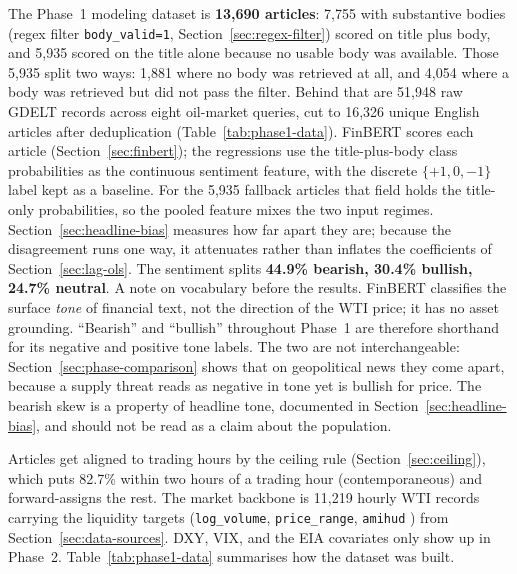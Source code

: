 The Phase~1 modeling dataset is \textbf{13{,}690 articles}: 7{,}755 with substantive bodies (regex filter \texttt{body\_valid=1}, Section~\ref{sec:regex-filter}) scored on title plus body, and 5{,}935 scored on the title alone because no usable body was available. Those 5{,}935 split two ways: 1{,}881 where no body was retrieved at all, and 4{,}054 where a body was retrieved but did not pass the filter. Behind that are 51{,}948 raw GDELT records across eight oil-market queries, cut to 16{,}326 unique English articles after deduplication (Table~\ref{tab:phase1-data}). FinBERT \citep{araci2019} scores each article (Section~\ref{sec:finbert}); the regressions use the title-plus-body class probabilities as the continuous sentiment feature, with the discrete $\{+1, 0, -1\}$ label kept as a baseline. For the 5{,}935 fallback articles that field holds the title-only probabilities, so the pooled feature mixes the two input regimes. Section~\ref{sec:headline-bias} measures how far apart they are; because the disagreement runs one way, it attenuates rather than inflates the coefficients of Section~\ref{sec:lag-ols}. The sentiment splits \textbf{44.9\% bearish, 30.4\% bullish, 24.7\% neutral}. A note on vocabulary before the results. FinBERT classifies the surface \emph{tone} of financial text, not the direction of the WTI price; it has no asset grounding. ``Bearish'' and ``bullish'' throughout Phase~1 are therefore shorthand for its negative and positive tone labels. The two are not interchangeable: Section~\ref{sec:phase-comparison} shows that on geopolitical news they come apart, because a supply threat reads as negative in tone yet is bullish for price. The bearish skew is a property of headline tone, documented in Section~\ref{sec:headline-bias}, and should not be read as a claim about the population.

Articles get aligned to trading hours by the ceiling rule (Section~\ref{sec:ceiling}), which puts 82.7\% within two hours of a trading hour (contemporaneous) and forward-assigns the rest. The market backbone is 11{,}219 hourly WTI records carrying the liquidity targets (\texttt{log\_volume}, \texttt{price\_range}, \texttt{amihud} \citep{amihud2002}) from Section~\ref{sec:data-sources}. DXY, VIX, and the EIA covariates only show up in Phase~2. Table~\ref{tab:phase1-data} summarises how the dataset was built.

